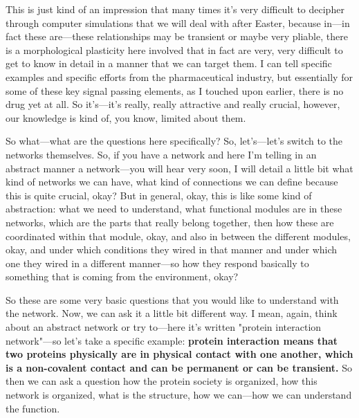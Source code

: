 This is just kind of an impression that many times it’s very difficult to decipher through computer simulations that we will deal with after Easter, because in—in fact these are—these relationships may be transient or maybe very pliable, there is a morphological plasticity here involved that in fact are very, very difficult to get to know in detail in a manner that we can target them. I can tell specific examples and specific efforts from the pharmaceutical industry, but essentially for some of these key signal passing elements, as I touched upon earlier, there is no drug yet at all. So it’s—it’s really, really attractive and really crucial, however, our knowledge is kind of, you know, limited about them.

So what—what are the questions here specifically? So, let’s—let’s switch to the networks themselves. So, if you have a network and here I’m telling in an abstract manner a network—you will hear very soon, I will detail a little bit what kind of networks we can have, what kind of connections we can define because this is quite crucial, okay? But in general, okay, this is like some kind of abstraction: what we need to understand, what functional modules are in these networks, which are the parts that really belong together, then how these are coordinated within that module, okay, and also in between the different modules, okay, and under which conditions they wired in that manner and under which one they wired in a different manner—so how they respond basically to something that is coming from the environment, okay?

So these are some very basic questions that you would like to understand with the network. Now, we can ask it a little bit different way. I mean, again, think about an abstract network or try to—here it’s written "protein interaction network"—so let’s take a specific example: \textbf{protein interaction means that two proteins physically are in physical contact with one another, which is a non-covalent contact and can be permanent or can be transient.} So then we can ask a question how the protein society is organized, how this network is organized, what is the structure, how we can—how we can understand the function.

